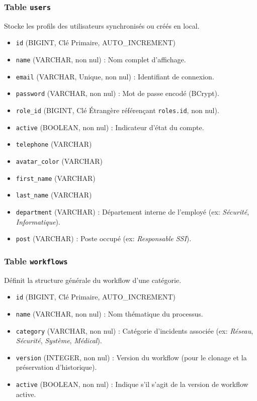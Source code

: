 \documentclass[12pt,a4paper]{article}
\begin{document}
\subsubsection{Table \texttt{users}}
Stocke les profils des utilisateurs synchronisés ou créés en local.
\begin{itemize}
    \item \texttt{id} (BIGINT, Clé Primaire, AUTO\_INCREMENT)
    \item \texttt{name} (VARCHAR, non nul) : Nom complet d'affichage.
    \item \texttt{email} (VARCHAR, Unique, non nul) : Identifiant de connexion.
    \item \texttt{password} (VARCHAR, non nul) : Mot de passe encodé (BCrypt).
    \item \texttt{role\_id} (BIGINT, Clé Étrangère référençant \texttt{roles.id}, non nul).
    \item \texttt{active} (BOOLEAN, non nul) : Indicateur d'état du compte.
    \item \texttt{telephone} (VARCHAR)
    \item \texttt{avatar\_color} (VARCHAR)
    \item \texttt{first\_name} (VARCHAR)
    \item \texttt{last\_name} (VARCHAR)
    \item \texttt{department} (VARCHAR) : Département interne de l'employé (ex: \textit{Sécurité}, \textit{Informatique}).
    \item \texttt{post} (VARCHAR) : Poste occupé (ex: \textit{Responsable SSI}).
\end{itemize}

\subsubsection{Table \texttt{workflows}}
Définit la structure générale du workflow d'une catégorie.
\begin{itemize}
    \item \texttt{id} (BIGINT, Clé Primaire, AUTO\_INCREMENT)
    \item \texttt{name} (VARCHAR, non nul) : Nom thématique du processus.
    \item \texttt{category} (VARCHAR, non nul) : Catégorie d'incidents associée (ex: \textit{Réseau}, \textit{Sécurité}, \textit{Système}, \textit{Médical}).
    \item \texttt{version} (INTEGER, non nul) : Version du workflow (pour le clonage et la préservation d'historique).
    \item \texttt{active} (BOOLEAN, non nul) : Indique s'il s'agit de la version de workflow active.
\end{itemize}
\end{document}
